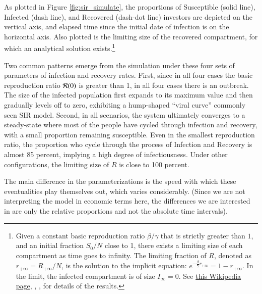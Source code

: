 As plotted in Figure \ref{fig:sir_simulate}, the proportions of Susceptible (solid line), Infected (dash line), and Recovered (dash-dot line) investors are depicted on the vertical axis, and elapsed time since the initial date of infection is on the horizontal axis.  Also plotted is the limiting size of the recovered compartment, for which an analytical solution exists.\footnote{Given a constant basic reproduction ratio $\beta/\gamma$ that is strictly greater than $1$, and an initial fraction $S_{0}/N$ close to 1, there exists a limiting size of each compartment as time goes to infinity. The limiting fraction of $R$, denoted as $r_{+\infty} = R_{+\infty}/N$, is the solution to the implicit equation: $e^{-\frac{\beta}{\gamma} r_{+\infty}} = 1-r_{+\infty}$.  In the limit, the infected compartment is of size $I_{\infty}=0$.  See  \href{https://en.wikipedia.org/wiki/Compartmental_models_in_epidemiology\#Transition_rates}{this Wikipedia page}, \cite{harko2014exact}, \href{{https://iopscience.iop.org/article/10.1088/1751-8121/abc65d}}{\cite{kroger2020analytical}}, \cite{okabe2021microscopic} for details of the results.}

Two common patterns emerge from the simulation under these four sets of parameters of infection and recovery rates.  First, since in all four cases the basic reproduction ratio $\mathcal{R}(0)$ is greater than 1, in all four cases there is an outbreak. The size of the infected population first expands to its maximum value and then gradually levels off to zero, exhibiting a hump-shaped ``viral curve'' commonly seen   SIR model.  Second, in all scenarios, the system ultimately converges to a steady-state where most of the people have cycled through infection and recovery, with a small proportion remaining susceptible. Even in the smallest reproduction ratio, the proportion who cycle through the process of Infection and Recovery is almost 85 percent, implying a high degree of infectiousness. Under other configurations, the limiting size of $R$ is close to 100 percent.

The main difference in the parameterizations is the speed with which these eventualities play themselves out, which varies considerably.  (Since we are not interpreting the model in economic terms here, the differences we are interested in are only the relative proportions and not the absolute time intervals).


